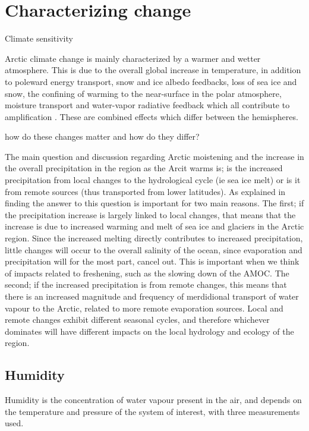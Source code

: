 \documentclass[11pt, oneside]{article}
\begin{document}
\section{Characterizing change}
Climate sensitivity 

Arctic climate change is mainly characterized by a warmer and wetter atmosphere. This is due to the overall global increase in temperature, in addition to poleward energy transport, snow and ice albedo feedbacks, loss of sea ice and snow, the confining of warming to the near-surface in the polar atmosphere, moisture transport and water-vapor radiative feedback which all contribute to amplification \cite{serreze2011processes}. These are combined effects which differ between the hemispheres.

{\color{blue}how do these changes matter and how do they differ?}

The main question and discussion regarding Arctic moistening and the increase in the overall precipitation in the region as the Arcit warms is; is the increased precipitation from local changes to the hydrological cycle (ie sea ice melt) or is it from remote sources (thus transported from lower latitudes). As explained in \cite{bintanja2014future} finding the answer to this question is important for two main reasons. The first; if the precipitation increase is largely linked to local changes, that means that the increase is due to increased warming and melt of sea ice and glaciers in the Arctic region. Since the increased melting directly contributes to increased precipitation, little changes will occur to the overall salinity of the ocean, since evaporation and precipitation will for the most part, cancel out. This is important when we think of impacts related to freshening, such as the slowing down of the AMOC. The second; if the increased precipitation is from remote changes, this means that there is an increased magnitude and frequency of merdidional transport of water vapour to the Arctic, related to more remote evaporation sources. Local and remote changes exhibit different seasonal cycles, and therefore whichever dominates will have different impacts on the local hydrology and ecology of the region.

\subsection{Humidity}\label{humidity}

Humidity is the concentration of water vapour present in the air, and depends on the temperature and pressure of the system of interest, with three measurements used. 
\end{document}
